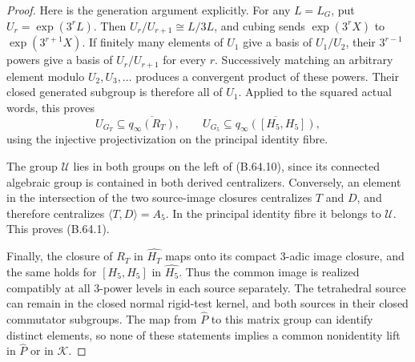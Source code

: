 \begin{proof}
Here is the generation argument explicitly.
For any $L=L_G$, put $U_r=\exp(3^rL)$.
Then $U_r/U_{r+1}\cong L/3L$, and cubing sends
$\exp(3^rX)$ to $\exp(3^{r+1}X)$.
If finitely many elements of $U_1$ give a basis of
$U_1/U_2$, their $3^{r-1}$ powers give a basis of
$U_r/U_{r+1}$ for every $r$.
Successively matching an arbitrary element modulo
$U_2,U_3,\ldots$ produces a convergent product of
these powers.  Their closed generated subgroup is
therefore all of $U_1$.
Applied to the squared actual words, this proves
\[
 U_{G_T}\subseteq\overline{q_\infty(R_T)},
 \qquad
 U_{G_5}\subseteq\overline{q_\infty([H_5,H_5])},            \tag{B.64.10}
\]
using the injective projectivization on the principal
identity fibre.

The group $\mathcal U$ lies in both groups on the left
of (B.64.10), since its connected algebraic group is
contained in both derived centralizers.
Conversely, an element in the intersection of the
two source-image closures centralizes $T$ and $D$,
and therefore centralizes $\langle T,D\rangle=A_5$.
In the principal identity fibre it belongs to
$\mathcal U$.  This proves (B.64.1).

Finally, the closure of $R_T$ in $\widehat{H_T}$ maps
onto its compact $3$-adic image closure, and the same
holds for $[H_5,H_5]$ in $\widehat{H_5}$.
Thus the common image is realized compatibly at all
$3$-power levels in each source separately.
The tetrahedral source can remain in the closed
normal rigid-test kernel, and both sources in their
closed commutator subgroups.
The map from $\widehat P$ to this matrix group can
identify distinct elements, so none of these
statements implies a common nonidentity lift in
$\widehat P$ or in $\mathcal K$.
\end{proof}
